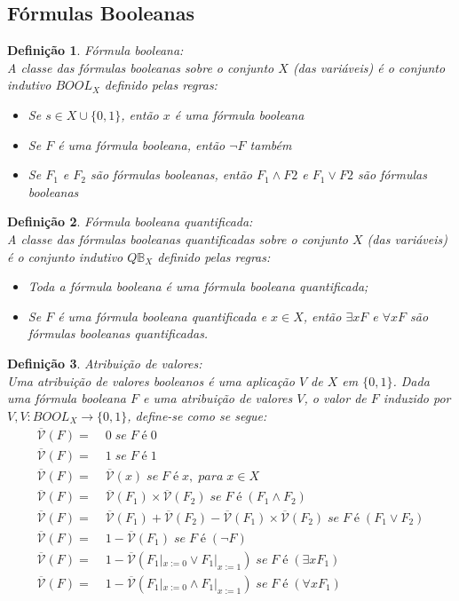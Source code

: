 \documentclass[10pt,a4paper]{report}
\newtheorem{definition}{Definição}
\begin{document}
\subsection{Fórmulas Booleanas}
\begin{definition} Fórmula booleana:\\
A classe das fórmulas booleanas sobre o conjunto $X$ (das variáveis) é o conjunto indutivo $BOOL_X$ definido pelas regras:
\begin{itemize}
\item Se $s \in X \cup \{0,1\}$, então $x$ é uma fórmula booleana
\item Se $F$ é uma fórmula booleana, então $\lnot F$ também
\item Se $F_1$ e $F_2$ são fórmulas booleanas, então $F_1 \land F2$ e $F_1 \lor F2$ são fórmulas booleanas
\end{itemize}
\end{definition}
\begin{definition} Fórmula booleana quantificada:\\
A classe das fórmulas booleanas quantificadas sobre o conjunto $X$ (das variáveis) é o conjunto indutivo $Q\mathbb{B}_X$ definido pelas regras:
\begin{itemize}
\item Toda a fórmula booleana é uma fórmula booleana quantificada;
\item Se $F$ é uma fórmula booleana quantificada e $x \in X$, então $\exists xF$ e $\forall xF$ são fórmulas booleanas quantificadas.
\end{itemize}
\end{definition}
\begin{definition} Atribuição de valores:\\
Uma atribuição de valores booleanos é uma aplicação $V$ de $X$ em $\{0, 1\}$. Dada uma fórmula booleana $F$ e uma atribuição de valores $V$, o valor de $F$ induzido por $V, V : BOOL_X \rightarrow \{0, 1\}$, define-se como se segue:
\begin{align}
\overline{\mathcal{V}}(F) =& \; 0 \; se \; F \; é \; 0\\
\overline{\mathcal{V}}(F) =& \; 1 \; se \; F \; é \; 1\\
\overline{\mathcal{V}}(F) =& \; \overline{\mathcal{V}}(x) \; se \; F \; é \; x, \; para \; x \in X\\
\overline{\mathcal{V}}(F) =& \; \overline{\mathcal{V}}(F_1) \times \overline{\mathcal{V}}(F_2) \; se \; F \; é \; (F_1 \land F_2)\\
\overline{\mathcal{V}}(F) =& \; \overline{\mathcal{V}}(F_1) + \overline{\mathcal{V}}(F_2) - \overline{\mathcal{V}}(F_1) \times \overline{\mathcal{V}}(F_2) \; se \; F \; é \; (F_1 \lor F_2)\\
\overline{\mathcal{V}}(F) =& \; 1 - \overline{\mathcal{V}}(F_1) \; se \; F \; é \; (\lnot F)\\
\overline{\mathcal{V}}(F) =& \; 1 - \overline{\mathcal{V}}(F_1|_{x := 0} \lor F_1|_{x := 1}) \; se \; F \; é \; (\exists xF_1)\\
\overline{\mathcal{V}}(F) =& \; 1 - \overline{\mathcal{V}}(F_1|_{x := 0} \land F_1|_{x := 1}) \; se \; F \; é \; (\forall xF_1)
\end{align}
\end{definition}
\end{document}
